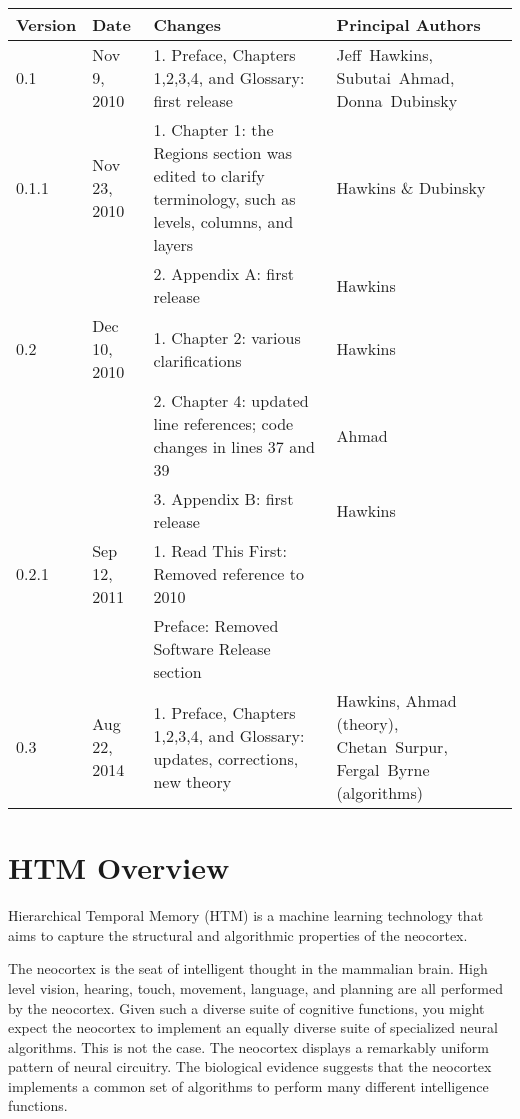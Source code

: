 \documentclass{report}
\begin{document}
\vspace{5mm}
\begin{tabular}{|p{}|p{}|>{\raggedright}p{}|>{\raggedright\arraybackslash}p{}|}
\hline
Version & Date & Changes & Principal Authors \\
\hline
0.1 & Nov 9, 2010 & 1. Preface, Chapters 1,2,3,4, and Glossary: first release & Jeff~Hawkins, Subutai~Ahmad, Donna~Dubinsky \\
\hline
0.1.1 & Nov 23, 2010 & 1. Chapter 1: the Regions section was edited to clarify terminology, such as levels, columns, and layers & Hawkins \& Dubinsky \\
 & & 2. Appendix A: first release & Hawkins \\
\hline
0.2 & Dec 10, 2010 & 1. Chapter 2: various clarifications & Hawkins \\
 & & 2. Chapter 4: updated line references; code changes in lines 37 and 39 & Ahmad \\
 & & 3. Appendix B: first release & Hawkins \\
\hline
0.2.1 & Sep 12, 2011 & 1. Read This First: Removed reference to 2010 & \\
 & & Preface: Removed Software Release section & \\
\hline
0.3 & Aug 22, 2014 & 1. Preface, Chapters 1,2,3,4, and Glossary: updates, corrections, new theory & 
Hawkins, Ahmad (theory), Chetan~Surpur, Fergal~Byrne (algorithms)\\
\hline
\end{tabular}

\chapter{HTM Overview}
\label{chapter:overview}

Hierarchical Temporal Memory (HTM) is a machine learning technology
that aims to capture the structural and algorithmic properties of the
neocortex.

The neocortex is the seat of intelligent thought in the mammalian
brain. High level vision, hearing, touch, movement, language, and
planning are all performed by the neocortex. Given such a diverse
suite of cognitive functions, you might expect the neocortex to
implement an equally diverse suite of specialized neural
algorithms. This is not the case. The neocortex displays a remarkably
uniform pattern of neural circuitry. The biological evidence suggests
that the neocortex implements a common set of algorithms to perform
many different intelligence functions.
\end{document}
